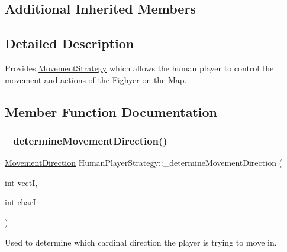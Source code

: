 \subsection*{Additional Inherited Members}


\subsection{Detailed Description}
Provides \hyperlink{class_movement_strategy}{Movement\+Strategy} which allows the human player to control the movement and actions of the Fighyer on the Map. 

\subsection{Member Function Documentation}
\hypertarget{class_human_player_strategy_aa1087e1c03873119655e0df3a325cc27}{}\label{class_human_player_strategy_aa1087e1c03873119655e0df3a325cc27} 
\subsubsection{\texorpdfstring{\+\_\+determine\+Movement\+Direction()}{\_determineMovementDirection()}}
{\footnotesize\ttfamily \hyperlink{_movement_strategy_8h_a0b5e764f0ec9a407e9b8789f0259d754}{Movement\+Direction} Human\+Player\+Strategy\+::\+\_\+determine\+Movement\+Direction (\begin{DoxyParamCaption}\item[{int}]{vectI,  }\item[{int}]{charI }\end{DoxyParamCaption})\hspace{0.3cm}{\ttfamily [protected]}}

Used to determine which cardinal direction the player is trying to move in. 

